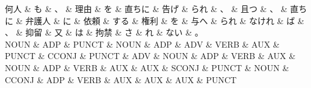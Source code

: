 \documentclass[tikz,border=5pt]{standalone}
\begin{document}
\small
\begin{dependency}[edge unit distance=12.0pt]
    \begin{deptext}[column sep=0.5em]
        何人 \& も \& 、 \& 理由 \& を \& 直ちに \& 告げ \& られ \& 、 \& 且つ \& 、 \& 直ちに \& 弁護人 \& に \& 依頼 \& する \& 権利 \& を \& 与へ \& られ \& なけれ \& ば \& 、 \& 抑留 \& 又 \& は \& 拘禁 \& さ \& れ \& ない \& 。\\
        NOUN \& ADP \& PUNCT \& NOUN \& ADP \& ADV \& VERB \& AUX \& PUNCT \& CCONJ \& PUNCT \& ADV \& NOUN \& ADP \& VERB \& AUX \& NOUN \& ADP \& VERB \& AUX \& AUX \& SCONJ \& PUNCT \& NOUN \& CCONJ \& ADP \& VERB \& AUX \& AUX \& AUX \& PUNCT\\
    \end{deptext}
\end{dependency}
\end{document}
